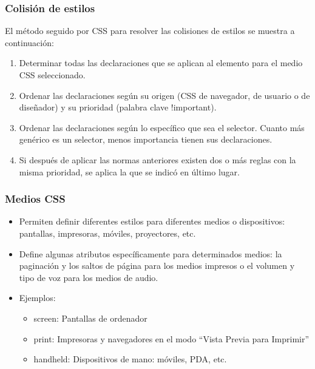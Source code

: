 \documentclass[ucs]{beamer}
\begin{document}
\begin{frame}
\frametitle{Colisión de estilos}

El método seguido por CSS para resolver las colisiones de estilos se muestra a continuación:

\begin{enumerate}
  \item Determinar todas las declaraciones que se aplican al elemento para el medio CSS seleccionado.
  \item Ordenar las declaraciones según su origen (CSS de navegador, de usuario o de diseñador) y su prioridad (palabra clave !important).
  \item Ordenar las declaraciones según lo específico que sea el selector. Cuanto más genérico es un selector, menos importancia tienen sus declaraciones.
  \item Si después de aplicar las normas anteriores existen dos o más reglas con la misma prioridad, se aplica la que se indicó en último lugar.
\end{enumerate}

\end{frame}




\begin{frame}
\frametitle{Medios CSS}

\begin{itemize}
  \item Permiten definir diferentes estilos para diferentes medios o dispositivos: pantallas, impresoras, móviles, proyectores, etc.
  \item Define algunas atributos específicamente para determinados medios: la paginación y los saltos de página para los medios impresos o el volumen y tipo de voz para los medios de audio.
  \item Ejemplos:
  \begin{itemize}
    \item screen: Pantallas de ordenador
    \item print: Impresoras y navegadores en el modo ``Vista Previa para Imprimir''
    \item handheld:	Dispositivos de mano: móviles, PDA, etc.
  \end{itemize}
\end{itemize}

\end{frame}
\end{document}
